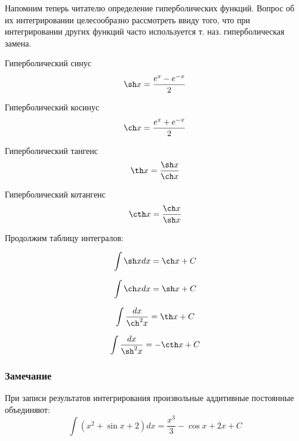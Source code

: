 Напомним теперь читателю определение гиперболических функций.
Вопрос об их интегрировании целесообразно рассмотреть ввиду того, что при интегрировании других функций часто используется т. наз. гиперболическая замена.

\opred

Гиперболический синус $$\sh x=\frac{e^x - e^{-x}}{2}$$

\opred

Гиперболический косинус $$\ch x=\frac{e^x + e^{-x}}{2}$$

\opred

Гиперболический тангенс $$\th x=\frac{\sh x}{\ch x}$$

\opred

Гиперболический котангенс $$\cth x=\frac{\ch x}{\sh x}$$

Продолжим таблицу интегралов:

\begin{list}{.}{}

\item
$$
\int \sh x dx= \ch x+C
$$

\item
$$
\int \ch x dx= \sh x+C
$$

\item
$$
\int \frac{dx}{\ch^2 x}= \th x+C
$$

\item
$$
\int \frac{dx}{\sh^2 x}= -\cth x+C
$$

\end{list}

\subsubsection{Замечание}

При записи результатов интегрирования произвольные аддитивные постоянные объединяют:
$$\int(x^2 + \sin x + 2)dx=\frac{x^3}{3}-\cos x + 2x +C$$

